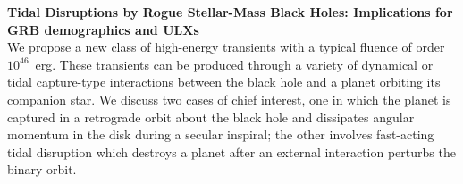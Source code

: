 {\bf Tidal Disruptions by Rogue Stellar-Mass Black Holes:  Implications for GRB demographics and ULXs}\\



We propose a new class of high-energy transients with a typical
  fluence of order $10^{46}$~erg.  These transients can be produced
  through a variety of dynamical or tidal capture-type interactions
  between the black hole and a planet orbiting its companion star.  We
  discuss two cases of chief interest, one in which the planet is
  captured in a retrograde orbit about the black hole and dissipates
  angular momentum in the disk during a secular inspiral; the other
  involves fast-acting tidal disruption which destroys a planet after
  an external interaction perturbs the binary orbit.
  
  
